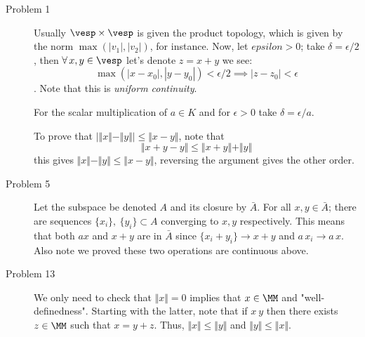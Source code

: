 \begin{description}
    \item[Problem 1] Usually $\vesp\times \vesp$ is given the product topology, which is given by the norm $\max(|v_1|,|v_2|)$, for instance. Now, let $epsilon>0$; take $\delta=\epsilon/2$, then $\forall \, x,y\in \vesp$ let's denote $z=x+y$ we see:
    $$    \max(|x-x_0|,|y-y_0|) < \epsilon/2 \implies |z-z_0|< \epsilon $$.
    Note that this is \emph{uniform continuity}.

    For the scalar multiplication of $a\in K$ and for $\epsilon>0$ take $\delta=\epsilon/a$.

    To prove that $|\Vert x \Vert - \Vert y \Vert | \leq \Vert x-y\Vert$, note that 
    $$\Vert x + y -y \Vert \leq \Vert x+ y\Vert + \Vert y \Vert$$
    this gives $\Vert x\Vert - \Vert y \Vert \leq \Vert x-y\Vert$, reversing the argument gives the other order.
\item[Problem 5] Let the subspace be denoted $A$ and its closure by $\bar A$. For all $x,y \in \bar A$; there are  sequences $\{x_i\},\ \{y_i\}\subset A$ converging to $x,y$ respectively. This means that both $ax$ and $x+y$ are in $ \bar A$ since $\{x_i+ y_i\}\to x+y$ and $a\, x_i \to a\, x$. Also note we proved these two operations are continuous above.
    \item[Problem 13] We only need to check that $\Vert x\Vert=0$ implies that $x\in \MM$ and "well-definedness". Starting with the latter, note that if $x~y$ then there exists $z\in \MM$ such that $x=y+z$. Thus, $\Vert x\Vert \leq \Vert y\Vert$ and $\Vert y\Vert \leq \Vert x\Vert$.
\end{description}
